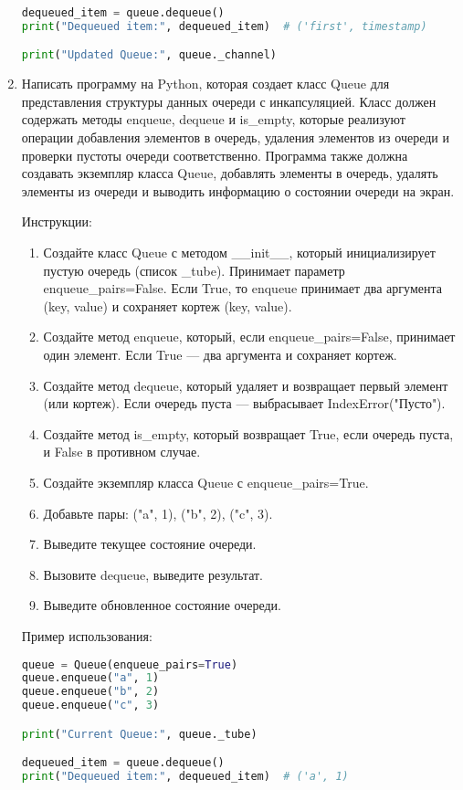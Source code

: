 \begin{enumerate}
\begin{lstlisting}[language=Python]
dequeued_item = queue.dequeue()
print("Dequeued item:", dequeued_item)  # ('first', timestamp)

print("Updated Queue:", queue._channel)
\end{lstlisting}

\item Написать программу на Python, которая создает класс Queue для представления структуры данных очереди с инкапсуляцией. Класс должен содержать методы enqueue, dequeue и is\_empty, которые реализуют операции добавления элементов в очередь, удаления элементов из очереди и проверки пустоты очереди соответственно. Программа также должна создавать экземпляр класса Queue, добавлять элементы в очередь, удалять элементы из очереди и выводить информацию о состоянии очереди на экран.

Инструкции:
\begin{enumerate}
    \item Создайте класс Queue с методом \_\_init\_\_, который инициализирует пустую очередь (список \_tube). Принимает параметр enqueue\_pairs=False. Если True, то enqueue принимает два аргумента (key, value) и сохраняет кортеж (key, value).
    \item Создайте метод enqueue, который, если enqueue\_pairs=False, принимает один элемент. Если True — два аргумента и сохраняет кортеж.
    \item Создайте метод dequeue, который удаляет и возвращает первый элемент (или кортеж). Если очередь пуста — выбрасывает IndexError("Пусто").
    \item Создайте метод is\_empty, который возвращает True, если очередь пуста, и False в противном случае.
    \item Создайте экземпляр класса Queue с enqueue\_pairs=True.
    \item Добавьте пары: ("a", 1), ("b", 2), ("c", 3).
    \item Выведите текущее состояние очереди.
    \item Вызовите dequeue, выведите результат.
    \item Выведите обновленное состояние очереди.
\end{enumerate}

Пример использования:
\begin{lstlisting}[language=Python]
queue = Queue(enqueue_pairs=True)
queue.enqueue("a", 1)
queue.enqueue("b", 2)
queue.enqueue("c", 3)

print("Current Queue:", queue._tube)

dequeued_item = queue.dequeue()
print("Dequeued item:", dequeued_item)  # ('a', 1)


\end{lstlisting}
\end{enumerate}
